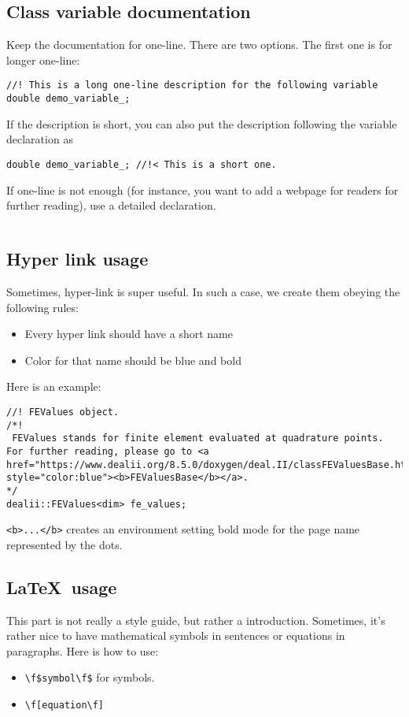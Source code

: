 \documentclass{article}
\newcommand{\latex}{\LaTeX}
\begin{document}
\subsection{Class variable documentation}
Keep the documentation for one-line. There are two options. The first one is for longer one-line:
\begin{lstlisting}
//! This is a long one-line description for the following variable
double demo_variable_;
\end{lstlisting}

If the description is short, you can also put the description following the variable declaration as
\begin{lstlisting}
double demo_variable_; //!< This is a short one.
\end{lstlisting}

If one-line is not enough (for instance, you want to add a webpage for readers for further reading), use a detailed declaration.
\begin{lstlisting}

\end{lstlisting}

\subsection{Hyper link usage}
Sometimes, hyper-link is super useful. In such a case, we create them obeying the following rules:
\begin{itemize}
	\item Every hyper link should have a short name
	\item Color for that name should be blue and bold
\end{itemize}

Here is an example:
\begin{lstlisting}
//! FEValues object.
/*!
 FEValues stands for finite element evaluated at quadrature points. For further reading, please go to <a href="https://www.dealii.org/8.5.0/doxygen/deal.II/classFEValuesBase.html" style="color:blue"><b>FEValuesBase</b></a>.
*/
dealii::FEValues<dim> fe_values;
\end{lstlisting}
{\tt <b>...</b>} creates an environment setting bold mode for the page name represented by the dots.

\subsection{\latex\ usage}
This part is not really a style guide, but rather a introduction. Sometimes, it's rather nice to have mathematical symbols in sentences or equations in paragraphs. Here is how to use:
\begin{itemize}
	\item {\tt \textbackslash f\$symbol\textbackslash f\$} for symbols.
	\item {\tt \textbackslash f[equation\textbackslash f]}
\end{itemize}
\end{document}
